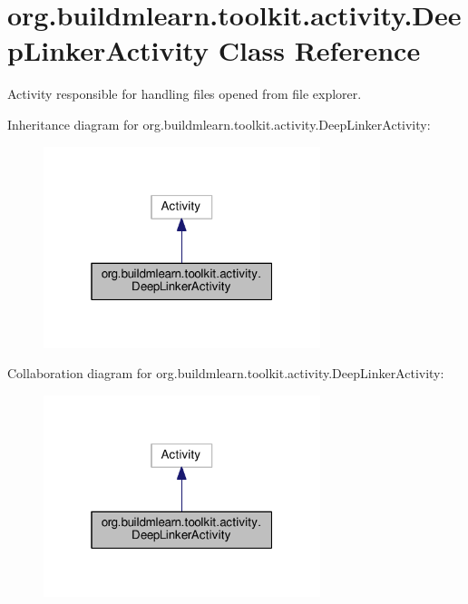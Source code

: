 \hypertarget{classorg_1_1buildmlearn_1_1toolkit_1_1activity_1_1DeepLinkerActivity}{}\section{org.\+buildmlearn.\+toolkit.\+activity.\+Deep\+Linker\+Activity Class Reference}
\label{classorg_1_1buildmlearn_1_1toolkit_1_1activity_1_1DeepLinkerActivity}


Activity responsible for handling files opened from file explorer.  




Inheritance diagram for org.\+buildmlearn.\+toolkit.\+activity.\+Deep\+Linker\+Activity\+:
\nopagebreak
\begin{figure}[H]
\begin{center}
\leavevmode
\includegraphics[width=229pt]{classorg_1_1buildmlearn_1_1toolkit_1_1activity_1_1DeepLinkerActivity__inherit__graph}
\end{center}
\end{figure}


Collaboration diagram for org.\+buildmlearn.\+toolkit.\+activity.\+Deep\+Linker\+Activity\+:
\nopagebreak
\begin{figure}[H]
\begin{center}
\leavevmode
\includegraphics[width=229pt]{classorg_1_1buildmlearn_1_1toolkit_1_1activity_1_1DeepLinkerActivity__coll__graph}
\end{center}
\end{figure}
